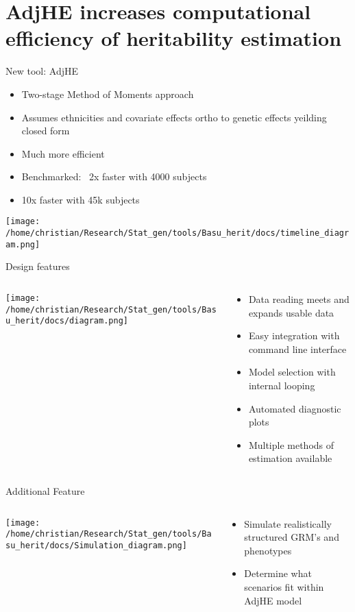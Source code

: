 \documentclass[
  ignorenonframetext,
]{beamer}
\begin{document}
\section{AdjHE increases computational efficiency of heritability estimation}
\begin{frame}{New tool: AdjHE}
	\begin{itemize}
		\item Two-stage Method of Moments approach
		\item Assumes ethnicities and covariate effects ortho to genetic effects yeilding closed form
		\item Much more efficient 
		\item Benchmarked: ~2x faster with 4000 subjects
		\item 10x faster with 45k subjects
	\end{itemize}
	 \texttt{[image: /home/christian/Research/Stat\_gen/tools/Basu\_herit/docs/timeline\_diagram.png]}
 \end{frame}
  
\begin{frame}{Design features}
\begin{columns}
\begin{column}{0.5\textwidth}
\texttt{[image: /home/christian/Research/Stat\_gen/tools/Basu\_herit/docs/diagram.png]}
\end{column}
\begin{column}{0.5\textwidth}
\begin{itemize}
	\item Data reading meets and expands usable data
	\item Easy integration with command line interface
	\item Model selection with internal looping
	\item Automated diagnostic plots
	\item Multiple methods of estimation available
\end{itemize}
\end{column}
\end{columns}
\end{frame}



\begin{frame}{Additional Feature}
\begin{columns}
\begin{column}{0.7\textwidth}
\texttt{[image: /home/christian/Research/Stat\_gen/tools/Basu\_herit/docs/Simulation\_diagram.png]}
\end{column}
\begin{column}{0.3\textwidth}
\begin{itemize}
	\item Simulate realistically structured GRM's and phenotypes
	\item Determine what scenarios fit within AdjHE model
\end{itemize}
\end{column}
\end{columns}
\end{frame}
\end{document}
